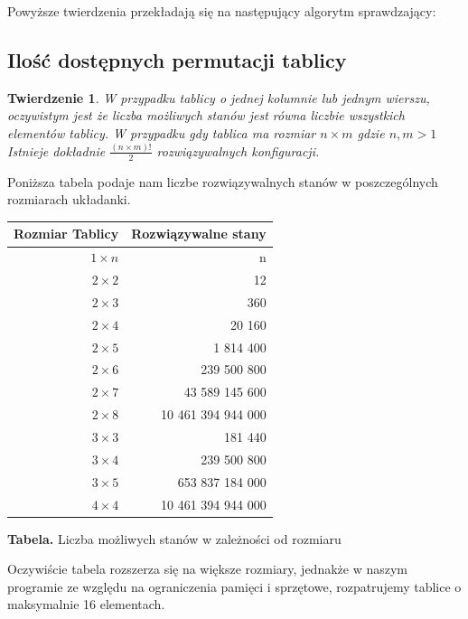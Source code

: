 \documentclass{classrep}
\newtheorem{theorem}{Twierdzenie}
\begin{document}
Powyższe twierdzenia przekładają się na następujący algorytm sprawdzający:


\subsection{Ilość dostępnych permutacji tablicy}

\begin{theorem}
\citep{sixteen} W przypadku tablicy o jednej kolumnie lub jednym wierszu, oczywistym jest że liczba możliwych stanów jest równa liczbie wszystkich elementów tablicy. W przypadku gdy tablica ma rozmiar $n\times m$ gdzie $n,m>1$ Istnieje dokładnie $\frac{(n\times m)!}{2}$ rozwiązywalnych konfiguracji. 
\end{theorem}

Poniższa tabela podaje nam liczbe rozwiązywalnych stanów w poszczególnych rozmiarach układanki.
\begin{center}
\begin{longtable}{|r|r|}
  \hline 
  Rozmiar Tablicy & Rozwiązywalne stany\\
  \hline
    $1 \times n$ & n \\
  \hline
  	$2 \times 2$ & 12 \\
  \hline
    $2 \times 3$ & 360 \\
  \hline
    $2 \times 4$ & 20 160 \\
  \hline
    $2 \times 5$ & 1 814 400 \\
  \hline
    $2 \times 6$ & 239 500 800 \\
  \hline
    $2 \times 7$ & 43 589 145 600 \\
  \hline
    $2 \times 8$ & 10 461 394 944 000 \\
  \hline
    $3 \times 3$ & 181 440 \\
  \hline
    $3 \times 4$ & 239 500 800 \\
  \hline
    $3 \times 5$ & 653 837 184 000 \\
  \hline
    $4 \times 4$ & 10 461 394 944 000 \\
  \hline
\end{longtable} 

\textbf{Tabela.} Liczba możliwych stanów w zależności od rozmiaru
\end{center}
Oczywiście tabela rozszerza się na większe rozmiary, jednakże w naszym programie ze względu na ograniczenia pamięci i sprzętowe, rozpatrujemy tablice o maksymalnie 16 elementach.
\end{document}
